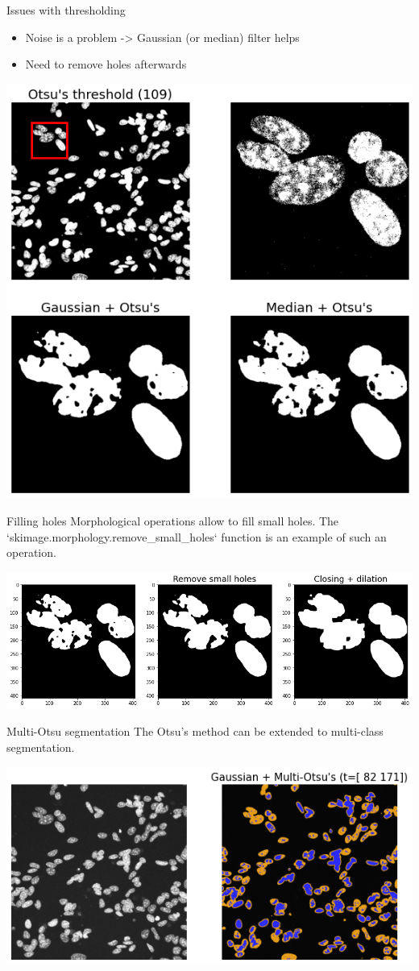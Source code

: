 \documentclass[9pt, aspectratio=169]{beamer}
\begin{document}
\begin{frame}
{Issues with thresholding}

\begin{itemize}
    \item Noise is a problem -> Gaussian (or median) filter helps
    \item Need to remove holes afterwards
\end{itemize}
\centering
\includegraphics[width=.4\textwidth]{otsu_and_smoothing.png}
\end{frame}

\begin{frame}
{Filling holes}
Morphological operations allow to fill small holes. 
The `skimage.morphology.remove\_small\_holes` function is an example of such an operation.

\includegraphics[width=\textwidth]{morphological.png}
\end{frame}
\begin{frame}
    {Multi-Otsu segmentation}
    The Otsu's method can be extended to multi-class segmentation.

    \includegraphics[width=\textwidth]{multiotsu.png}
\end{frame}
\end{document}
